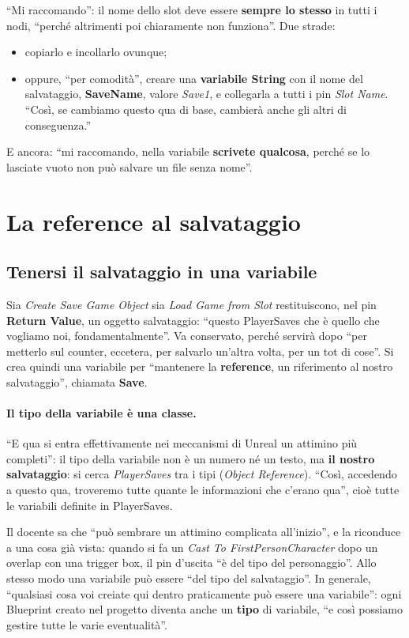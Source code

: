 ``Mi raccomando'': il nome dello slot deve essere \textbf{sempre lo stesso} in
tutti i nodi, ``perché altrimenti poi chiaramente non funziona''. Due strade:
\begin{itemize}
  \item copiarlo e incollarlo ovunque;
  \item oppure, ``per comodità'', creare una \textbf{variabile String} con il nome
        del salvataggio, \textbf{SaveName}, valore \emph{Save1}, e collegarla a
        tutti i pin \emph{Slot Name}. ``Così, se cambiamo questo qua di base,
        cambierà anche gli altri di conseguenza.''
\end{itemize}
E ancora: ``mi raccomando, nella variabile \textbf{scrivete qualcosa}, perché se
lo lasciate vuoto non può salvare un file senza nome''.

\section{La reference al salvataggio}
\label{gd16:sec:reference}

\subsection{Tenersi il salvataggio in una variabile}

Sia \emph{Create Save Game Object} sia \emph{Load Game from Slot} restituiscono,
nel pin \textbf{Return Value}, un oggetto salvataggio: ``questo PlayerSaves che è
quello che vogliamo noi, fondamentalmente''. Va conservato, perché servirà dopo
``per metterlo sul counter, eccetera, per salvarlo un'altra volta, per un tot di
cose''. Si crea quindi una variabile per ``mantenere la \textbf{reference}, un
riferimento al nostro salvataggio'', chiamata \textbf{Save}.

\paragraph{Il tipo della variabile è una classe.} ``E qua si entra effettivamente
nei meccanismi di Unreal un attimino più completi'': il tipo della variabile non
è un numero né un testo, ma \textbf{il nostro salvataggio}: si cerca
\emph{PlayerSaves} tra i tipi (\emph{Object Reference}). ``Così, accedendo a
questo qua, troveremo tutte quante le informazioni che c'erano qua'', cioè tutte
le variabili definite in PlayerSaves.

Il docente sa che ``può sembrare un attimino complicata all'inizio'', e la
riconduce a una cosa già vista: quando si fa un \emph{Cast To
FirstPersonCharacter} dopo un overlap con una trigger box, il pin d'uscita
``è del tipo del personaggio''. Allo stesso modo una variabile può essere ``del
tipo del salvataggio''. In generale, ``qualsiasi cosa voi creiate qui dentro
praticamente può essere una variabile'': ogni Blueprint creato nel progetto
diventa anche un \textbf{tipo} di variabile, ``e così possiamo gestire tutte le
varie eventualità''.

